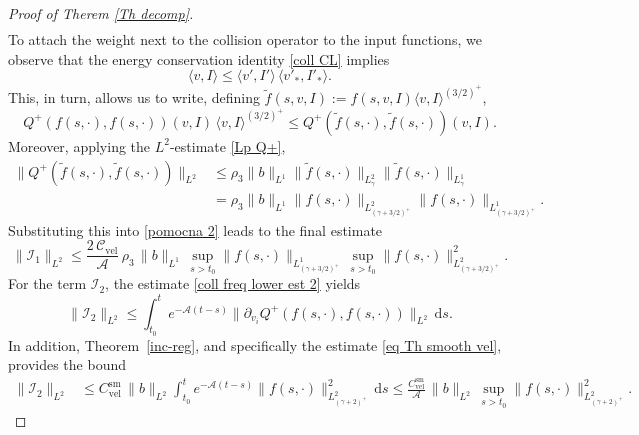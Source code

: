 \documentclass[11pt,a4paper]{amsart}
\newcommand{\md}{\mathrm{d}}
\newcommand{\g}{\gamma}
\newcommand{\Ls}{L^1}
\newcommand{\mA}{\mathcal{A}}
\newcommand{\Csvel}{C_{\text{vel}}^{\text{sm}}}
\newcommand{\Clvel}{\mathcal{C}_{\text{vel}}}
\begin{document}
\begin{proof}[Proof of Therem \ref{Th decomp}]
\begin{equation}
\begin{split}
	\end{split}
\end{equation}
To attach the weight next to the collision operator to the input functions, we observe that the energy conservation identity \eqref{coll CL} implies
\begin{equation*}
	\langle v, I \rangle \leq \langle v', I' \rangle \, \langle v'_*, I'_* \rangle.
\end{equation*}
This, in turn, allows us to write, defining $\tilde{f}(s,v,I) := f(s,v,I) \langle v, I \rangle^{(3/2)^+}$, 
\begin{equation*}
	Q^+(f(s,\cdot), f(s,\cdot))(v,I) \, \langle v, I \rangle^{(3/2)^+} \leq Q^+(\tilde{f}(s,\cdot), \tilde{f}(s,\cdot))(v,I).
\end{equation*}
Moreover,  applying the $L^2$-estimate \eqref{Lp Q+}, 
\begin{equation*}
	\begin{split}
		\| Q^+(\tilde{f}(s,\cdot),\tilde{f}(s,\cdot)) \|_{L^2} & \leq 	    \rho_3	\| b \|_{\Ls}   \| \tilde{f}(s,\cdot)    \|_{L^2_{ \g}}  \|  	\tilde{f}(s,\cdot)    \|_{L^1_{\g}} \\ & =   \rho_3	\| b \|_{\Ls}   \|  {f}(s,\cdot)    \|_{L^2_{(\g+3/2)^+}}  \|  	{f}(s,\cdot)    \|_{L^1_{(\g+3/2)^+}}.
	\end{split}
\end{equation*}
Substituting this into \eqref{pomocna 2} leads to the final estimate
\begin{equation}\label{I1 L2}
	\| \mathcal{I}_1 \|_{L^2} \leq  \frac{2 \, \Clvel}{\mA}   \,    \rho_3 \,  	\| b \|_{\Ls}\, \sup_{s>t_0}	\| f(s,\cdot) \|_{L^{1}_{(\g+3/2)^+}} \, \sup_{s>t_0}	\| f(s,\cdot) \|^2_{L^{2}_{(\g+3/2)^+}}.
\end{equation}
For the term $\mathcal{I}_2 $, 
the estimate \eqref{coll freq lower est 2} yields
\begin{equation*}
\|	\mathcal{I}_2  \|_{L^2} \leq  \int_{t_0}^t  e^{- \mA (t-s)} \|  \partial_{v_i} Q^+(f(s,\cdot),f(s,\cdot)) \|_{L^2}  \, \md s.
\end{equation*}
 In addition, Theorem~\ref{inc-reg}, and specifically the estimate \eqref{eq Th smooth vel}, provides the bound
\begin{equation}\label{I2 L2}
	\begin{split}
	\|	\mathcal{I}_2  \|_{L^2} & \leq  \Csvel  \, \|b\|_{L^{2}} \int_{t_0}^t  e^{- \mA (t-s)}  \| f(s,\cdot) \|^2_{L^{2}_{(\gamma+2)^+}} \, \md s
	\leq \frac{ \Csvel}{\mA} \, \|b\|_{L^{2}} \, \sup_{s > t_0 } \| f(s,\cdot) \|^2_{L^{2}_{(\gamma+2)^+}}.

\end{split}
\end{equation}
\end{proof}
\end{document}
